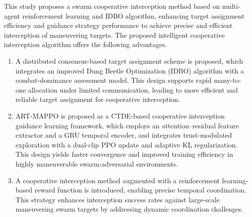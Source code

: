 \documentclass[lettersize,journal]{IEEEtran}
\newcommand{\hladd}[1]{{\color{blue}#1}}
\newcommand{\hldel}[1]{{\color{red}\sout{#1}}}
\begin{document}
This study proposes a swarm cooperative interception method based on multi-agent reinforcement
learning and IDBO algorithm, enhancing target assignment efficiency and guidance strategy
performance to achieve precise and efficient interception of maneuvering targets.
The proposed intelligent cooperative interception algorithm offers the following advantages.

\begin{enumerate}
\item A distributed consensus-based target assignment scheme is proposed, which integrates an
improved Dung Beetle Optimization (IDBO) algorithm with a combat-dominance assessment model.
This design supports rapid many-to-one allocation under limited communication, leading to more
efficient and reliable target assignment for cooperative interception.

\item ART-MAPPO is proposed as a CTDE-based cooperative interception guidance learning
framework, which employs an attention--residual feature extractor and a GRU temporal encoder,
and integrates trust-modulated exploration with a dual-clip PPO update and adaptive KL
regularization. This design yields faster convergence and improved training efficiency in
highly maneuverable swarm-adversarial environments.


\item A cooperative interception method augmented with a reinforcement learning-based reward
function is introduced, enabling precise temporal coordination. This strategy enhances
interception success rates against large-scale maneuvering swarm targets by addressing dynamic
coordination challenges.

\end{enumerate}
\end{document}

